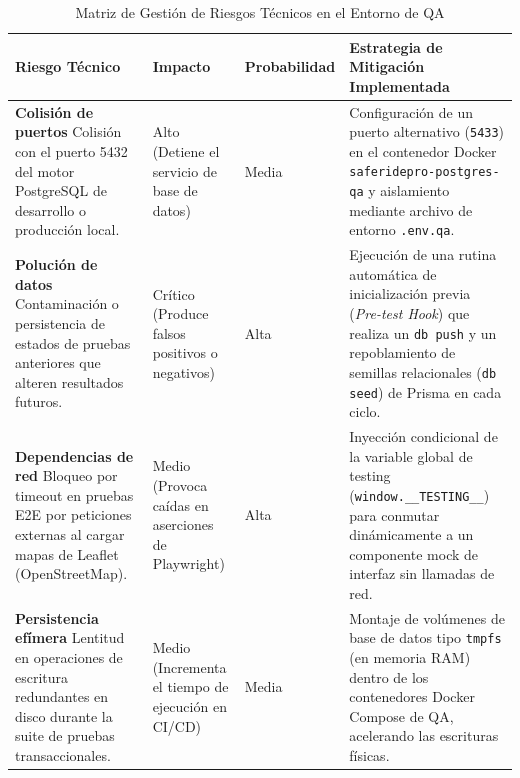 \documentclass{article}
\begin{document}
\begin{table}[H]
\centering
\small
\caption{Matriz de Gestión de Riesgos Técnicos en el Entorno de QA} \label{tab:riesgos}
\begin{tabularx}{\linewidth}{|P{3.5cm}|P{2.2cm}|P{3.5cm}|X|}
\hline
{}
\textbf{Riesgo Técnico} & \textbf{Impacto} & \textbf{Probabilidad} & \textbf{Estrategia de Mitigación Implementada} \\
\hline
\textbf{Colisión de puertos} \newline Colisión con el puerto 5432 del motor PostgreSQL de desarrollo o producción local. & Alto \newline (Detiene el servicio de base de datos) & Media & Configuración de un puerto alternativo (\texttt{5433}) en el contenedor Docker \texttt{saferidepro-postgres-qa} y aislamiento mediante archivo de entorno \texttt{.env.qa}. \\
\hline
\textbf{Polución de datos} \newline Contaminación o persistencia de estados de pruebas anteriores que alteren resultados futuros. & Crítico \newline (Produce falsos positivos o negativos) & Alta & Ejecución de una rutina automática de inicialización previa (\textit{Pre-test Hook}) que realiza un \texttt{db push} y un repoblamiento de semillas relacionales (\texttt{db seed}) de Prisma en cada ciclo. \\
\hline
\textbf{Dependencias de red} \newline Bloqueo por timeout en pruebas E2E por peticiones externas al cargar mapas de Leaflet (OpenStreetMap). & Medio \newline (Provoca caídas en aserciones de Playwright) & Alta & Inyección condicional de la variable global de testing (\texttt{window.\_\_TESTING\_\_}) para conmutar dinámicamente a un componente mock de interfaz sin llamadas de red. \\
\hline
\textbf{Persistencia efímera} \newline Lentitud en operaciones de escritura redundantes en disco durante la suite de pruebas transaccionales. & Medio \newline (Incrementa el tiempo de ejecución en CI/CD) & Media & Montaje de volúmenes de base de datos tipo \texttt{tmpfs} (en memoria RAM) dentro de los contenedores Docker Compose de QA, acelerando las escrituras físicas. \\
\hline
\end{tabularx}
\end{table}
\end{document}
